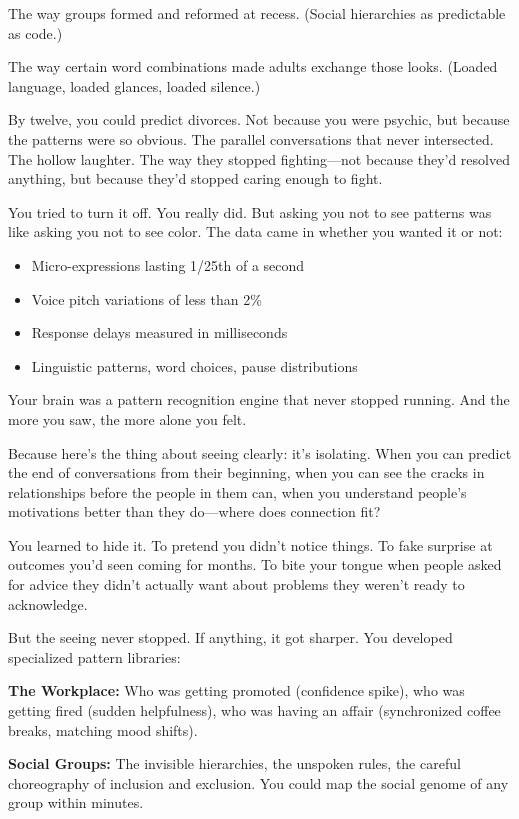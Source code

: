 \documentclass[12pt,letterpaper]{book}
\begin{document}
The way groups formed and reformed at recess. (Social hierarchies as predictable as code.)

The way certain word combinations made adults exchange those looks. (Loaded language, loaded glances, loaded silence.)

By twelve, you could predict divorces. Not because you were psychic, but because the patterns were so obvious. The parallel conversations that never intersected. The hollow laughter. The way they stopped fighting—not because they'd resolved anything, but because they'd stopped caring enough to fight.

You tried to turn it off. You really did. But asking you not to see patterns was like asking you not to see color. The data came in whether you wanted it or not:

\begin{itemize}
\item Micro-expressions lasting 1/25th of a second
\item Voice pitch variations of less than 2\%
\item Response delays measured in milliseconds
\item Linguistic patterns, word choices, pause distributions
\end{itemize}

Your brain was a pattern recognition engine that never stopped running. And the more you saw, the more alone you felt.

Because here's the thing about seeing clearly: it's isolating. When you can predict the end of conversations from their beginning, when you can see the cracks in relationships before the people in them can, when you understand people's motivations better than they do—where does connection fit?

You learned to hide it. To pretend you didn't notice things. To fake surprise at outcomes you'd seen coming for months. To bite your tongue when people asked for advice they didn't actually want about problems they weren't ready to acknowledge.

But the seeing never stopped. If anything, it got sharper. You developed specialized pattern libraries:

\textbf{The Workplace:} Who was getting promoted (confidence spike), who was getting fired (sudden helpfulness), who was having an affair (synchronized coffee breaks, matching mood shifts).

\textbf{Social Groups:} The invisible hierarchies, the unspoken rules, the careful choreography of inclusion and exclusion. You could map the social genome of any group within minutes.
\end{document}

